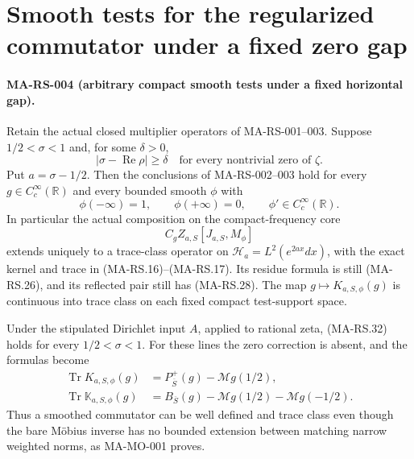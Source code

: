 \section{Smooth tests for the regularized commutator under a fixed zero gap}
\label{sec:regularized-smooth}

\paragraph{MA-RS-004 (arbitrary compact smooth tests under a fixed horizontal gap).}
Retain the actual closed multiplier operators of MA-RS-001--003.
Suppose $1/2<\sigma<1$ and, for some $\delta>0$,
\[
       |\sigma-\operatorname{Re}\rho|\ge\delta
          \quad\text{for every nontrivial zero of }\zeta.
 \tag{MA-RS.32}
\]
Put $a=\sigma-1/2$. Then the conclusions of MA-RS-002--003
hold for every $g\in C_c^\infty(\mathbb R)$ and every bounded
smooth $\phi$ with
\[
       \phi(-\infty)=1,\qquad \phi(+\infty)=0,
                         \qquad\phi'\in C_c^\infty(\mathbb R).
 \tag{MA-RS.33}
\]
In particular the actual composition on the compact-frequency core
\[
             C_gZ_{a,S}[J_{a,S},M_\phi]
 \tag{MA-RS.34}
\]
extends uniquely to a trace-class operator on
$\mathcal H_a=L^2(e^{2ax}dx)$, with the exact kernel and trace
in (MA-RS.16)--(MA-RS.17). Its residue formula is still
(MA-RS.26), and its reflected pair still has (MA-RS.28).
The map $g\mapsto K_{a,S,\phi}(g)$ is continuous into trace
class on each fixed compact test-support space.

Under the stipulated Dirichlet input $A$, applied to rational
zeta, (MA-RS.32) holds for every $1/2<\sigma<1$.
For these lines the zero correction is absent, and the formulas
become
\[
 \begin{aligned}
 \operatorname{Tr}K_{a,S,\phi}(g)
     &=P_{\overline S}^{+}(g)-\mathcal Mg(1/2),\\
 \operatorname{Tr}\mathbb K_{a,S,\phi}(g)
     &=B_{\overline S}(g)
          -\mathcal Mg(1/2)-\mathcal Mg(-1/2).
 \end{aligned}
 \tag{MA-RS.35}
\]
Thus a smoothed commutator can be well defined and trace class
even though the bare M\"obius inverse has no bounded extension
between matching narrow weighted norms, as MA-MO-001 proves.

